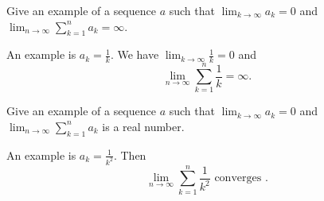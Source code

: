 \documentclass[12pt,fleqn,answers]{exam}
\begin{document}
\begin{questions}
    \question   Give an example of a sequence $a$ such that
    $\displaystyle \lim_{k \to \infty} a_k = 0$ and $\displaystyle \lim_{n \to \infty} \sum_{k=1}^n a_k  = \infty$.
    
    \begin{solution}[1.50in]
    An example is $a_k = \frac{1}{k}$.  We have 
    $\displaystyle \lim_{k \to \infty} \frac{1}{k} = 0$ and 
        \begin{equation*}
              \lim_{n\to \infty}  \sum_{k=1}^n \frac{1}{k} = \infty.
        \end{equation*}
    \end{solution}
    \question   Give an example of a sequence $a$ such that
    $\displaystyle \lim_{k \to \infty} a_k = 0$ and $\displaystyle \lim_{n \to \infty} \sum_{k=1}^n a_k$ is a real 
    number.
    
    \begin{solution}%
    An example is $a_k = \frac{1}{k^2}$. Then 
        \begin{equation*}
            \lim_{n \to \infty} \sum_{k=1}^n \frac{1}{k^2}  \text{ converges }.
      \end{equation*}
    \end{solution}
    

\end{questions}
\end{document}
